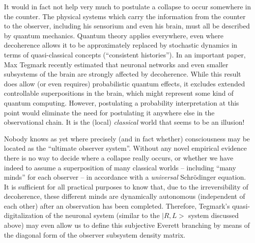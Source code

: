 It would in fact not help very much to postulate a collapse to occur
somewhere in the counter. The physical systems which carry the
information from the counter to the observer, including his sensorium
and even his brain, must all be described by quantum mechanics.
Quantum theory applies everywhere, even where
decoherence allows it to be approximately replaced by stochastic
dynamics in terms of quasi-classical
concepts (``consistent histories''). In an important paper, Max
Tegmark \cite{tegmark} recently estimated that neuronal networks and
even smaller subsystems of the brain are strongly affected by
decoherence. While this result does allow (or even requires)
probabilistic quantum effects, it excludes extended controllable
superpositions in the brain, which might represent some kind of
quantum computing. However, postulating a probability interpretation
at this point would eliminate the need for postulating it anywhere
else in the observational chain. It is the (local) {\it
classical} world that seems to be an illusion!

Nobody knows as yet where precisely (and in fact whether) consciousness
may be located as the ``ultimate observer system''. Without
any novel empirical evidence there is no way to decide where a
collapse really occurs, or whether we have indeed to assume a
superposition of many classical worlds -- including ``many minds''
\cite{ZConsc} for each observer -- in accordance with a {\it universal}
Schr\"odinger equation. It is sufficient for all practical purposes to
know that, due to the irreversibility of decoherence, these different
minds are dynamically autonomous (independent of each other) after an
observation has been completed. Therefore, Tegmark's
quasi-digitalization of the neuronal system (similar to the $|R,L>$
system discussed above) may even allow us to define this subjective
Everett branching by means of the diagonal form of the observer
subsystem density matrix.

